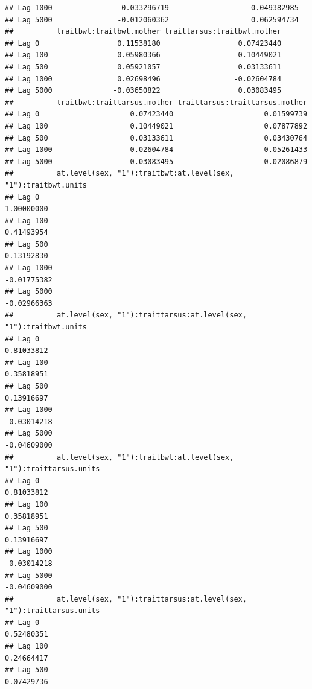 \documentclass[
  12pt,
]{book}
\begin{document}
\begin{verbatim}
## Lag 1000                0.033296719                  -0.049382985
## Lag 5000               -0.012060362                   0.062594734
##          traitbwt:traitbwt.mother traittarsus:traitbwt.mother
## Lag 0                  0.11538180                  0.07423440
## Lag 100                0.05980366                  0.10449021
## Lag 500                0.05921057                  0.03133611
## Lag 1000               0.02698496                 -0.02604784
## Lag 5000              -0.03650822                  0.03083495
##          traitbwt:traittarsus.mother traittarsus:traittarsus.mother
## Lag 0                     0.07423440                     0.01599739
## Lag 100                   0.10449021                     0.07877892
## Lag 500                   0.03133611                     0.03430764
## Lag 1000                 -0.02604784                    -0.05261433
## Lag 5000                  0.03083495                     0.02086879
##          at.level(sex, "1"):traitbwt:at.level(sex, "1"):traitbwt.units
## Lag 0                                                       1.00000000
## Lag 100                                                     0.41493954
## Lag 500                                                     0.13192830
## Lag 1000                                                   -0.01775382
## Lag 5000                                                   -0.02966363
##          at.level(sex, "1"):traittarsus:at.level(sex, "1"):traitbwt.units
## Lag 0                                                          0.81033812
## Lag 100                                                        0.35818951
## Lag 500                                                        0.13916697
## Lag 1000                                                      -0.03014218
## Lag 5000                                                      -0.04609000
##          at.level(sex, "1"):traitbwt:at.level(sex, "1"):traittarsus.units
## Lag 0                                                          0.81033812
## Lag 100                                                        0.35818951
## Lag 500                                                        0.13916697
## Lag 1000                                                      -0.03014218
## Lag 5000                                                      -0.04609000
##          at.level(sex, "1"):traittarsus:at.level(sex, "1"):traittarsus.units
## Lag 0                                                             0.52480351
## Lag 100                                                           0.24664417
## Lag 500                                                           0.07429736

\end{verbatim}
\end{document}
